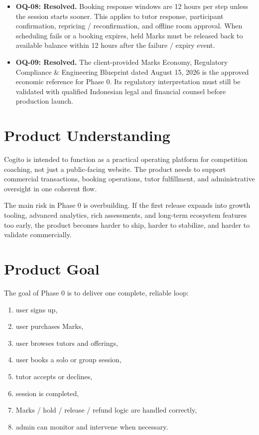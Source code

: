 \documentclass[11pt,a4paper]{article}
\begin{document}
\begin{itemize}
    \item \textbf{OQ-08: Resolved.} Booking response windows are 12 hours per step unless the session starts sooner. This applies to tutor response, participant confirmation, repricing / reconfirmation, and offline room approval. When scheduling fails or a booking expires, held Marks must be released back to available balance within 12 hours after the failure / expiry event.
    \item \textbf{OQ-09: Resolved.} The client-provided Marks Economy, Regulatory Compliance \& Engineering Blueprint dated August 15, 2026 is the approved economic reference for Phase 0. Its regulatory interpretation must still be validated with qualified Indonesian legal and financial counsel before production launch.
\end{itemize}

\section{Product Understanding}

Cogito is intended to function as a practical operating platform for competition coaching, not just a public-facing website. The product needs to support commercial transactions, booking operations, tutor fulfillment, and administrative oversight in one coherent flow.

The main risk in Phase 0 is overbuilding. If the first release expands into growth tooling, advanced analytics, rich assessments, and long-term ecosystem features too early, the product becomes harder to ship, harder to stabilize, and harder to validate commercially.

\section{Product Goal}

The goal of Phase 0 is to deliver one complete, reliable loop:
\begin{enumerate}
	\item user signs up,
	\item user purchases Marks,
	\item user browses tutors and offerings,
	\item user books a solo or group session,
	\item tutor accepts or declines,
	\item session is completed,
	\item Marks / hold / release / refund logic are handled correctly,
	\item admin can monitor and intervene when necessary.
\end{enumerate}
\end{document}
